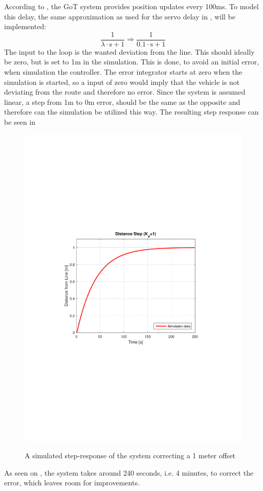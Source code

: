 According to , the GoT system provides position updates every 100ms. To model this delay, the same approximation as used for the servo delay in , will be implemented:
$$\frac{1}{\lambda\cdot\text{s}+1}\Rightarrow\frac{1}{\SI{0,1}\cdot\text{s}+1}
$$
The input to the loop is the wanted deviation from the line. This should ideally be zero, but is set to 1m in the simulation. This is done, to avoid an initial error, when simulation the controller. The error integrator starts at zero when the simulation is started, so a input of zero would imply that the vehicle is not deviating from the route and therefore no error. Since the system is assumed linear, a step from 1m to 0m error, should be the same as the opposite and therefore can the simulation be utilized this way. The resulting step response can be seen in 

\begin{figure}[H]
  \centering
  {
    \includegraphics[width=1.4\textwidth]{figures/distanceStep1.pdf}
  }
  \caption{A simulated step-response of the system correcting a 1 meter offset}
  \label{SimulationSteeringP1}
\end{figure}
As seen on , the system takes around 240 seconds, i.e. 4 minutes, to correct the error, which leaves room for improvements.

